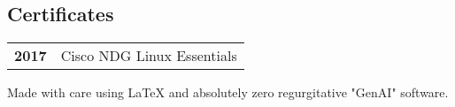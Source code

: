 \documentclass[lighthipster]{simplehipstercv}
\newlength{\rightcolwidth}
\begin{document}
\begin{paracol}{2}
\section*{Certificates}
\begin{tabular}{>{\footnotesize\bfseries}r >{\footnotesize}p{}}
    2017 & Cisco NDG Linux Essentials
\end{tabular}
\bigskip




\vfill{} %
\vspace{4em}
\setlength{\parindent}{0pt}
\begin{minipage}[t]{\rightcolwidth}
\vfill
\begin{center}\fontfamily{\sfdefault}\selectfont \color{black!70}
{
  \small{Made with care using \LaTeX{} and absolutely zero regurgitative "GenAI" software.}
}
\end{center}
\end{minipage}

\vspace{48em}
\end{paracol}
\end{document}
